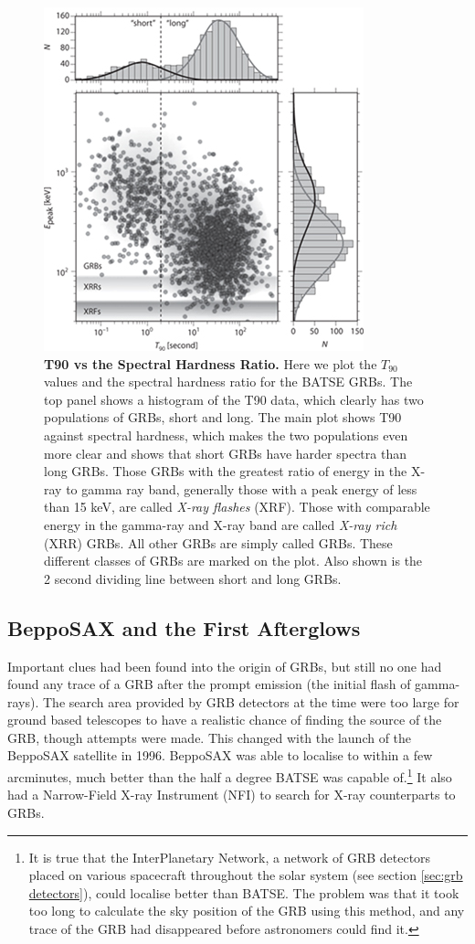 \documentclass[11pt]{cuthesis}
\begin{document}
\begin{figure} %
\begin{center}
\includegraphics[width=0.6\linewidth]{t90_vs_hardness_new.jpg}
\end{center}
\caption{\textbf{T90 vs the Spectral Hardness Ratio.} Here we plot the $T_{90}$ values and the spectral hardness ratio for the BATSE GRBs. The top panel shows a histogram of the T90 data, which clearly has two populations of GRBs, short and long. The main plot shows T90 against spectral hardness, which makes the two populations even more clear and shows that short GRBs have harder spectra than long GRBs. Those GRBs with the greatest ratio of energy in the X-ray to gamma ray band, generally those with a peak energy of less than 15 keV, are called \textit{X-ray flashes} (XRF). Those with comparable energy in the gamma-ray and X-ray band are called \textit{X-ray rich} (XRR) GRBs. All other GRBs are simply called GRBs. These different classes of GRBs are marked on the plot. Also shown is the 2 second dividing line between short and long GRBs.\cite{bloom_grbs}}
\label{fig:t90 vs hardness}
\end{figure}

\subsection{BeppoSAX and the First Afterglows}
Important clues had been found into the origin of GRBs, but still no one had found any trace of a GRB after the prompt emission (the initial flash of gamma-rays). The search area provided by GRB detectors at the time were too large for ground based telescopes to have a realistic chance of finding the source of the GRB, though attempts were made. This changed with the launch of the BeppoSAX satellite in 1996. BeppoSAX was able to localise to within a few arcminutes, much better than the half a degree BATSE was capable of.\footnote{It is true that the InterPlanetary Network, a network of GRB detectors placed on various spacecraft throughout the solar system (see section \ref{sec:grb detectors}), could localise better than BATSE. The problem was that it took too long to calculate the sky position of the GRB using this method, and any trace of the GRB had disappeared before astronomers could find it.} It also had a Narrow-Field X-ray Instrument (NFI) to search for X-ray counterparts to GRBs.
\end{document}
